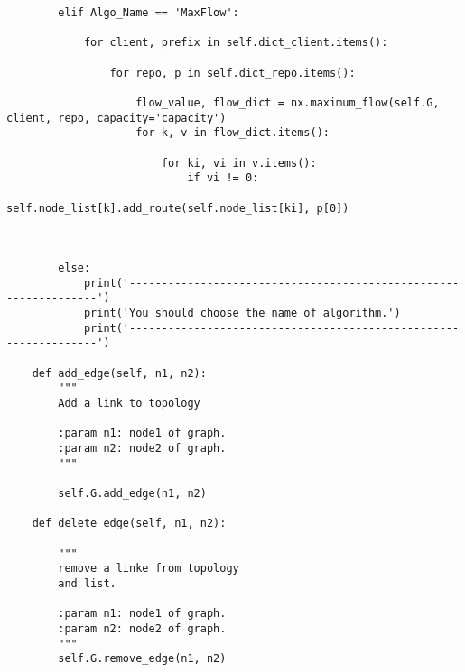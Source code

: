 \begin{lstlisting}
        elif Algo_Name == 'MaxFlow':

            for client, prefix in self.dict_client.items():

                for repo, p in self.dict_repo.items():

                    flow_value, flow_dict = nx.maximum_flow(self.G, client, repo, capacity='capacity')
                    for k, v in flow_dict.items():
                        
                        for ki, vi in v.items():
                            if vi != 0:
                                self.node_list[k].add_route(self.node_list[ki], p[0]) 



        else:
            print('-----------------------------------------------------------------')
            print('You should choose the name of algorithm.')
            print('-----------------------------------------------------------------')

    def add_edge(self, n1, n2):
        """
        Add a link to topology

        :param n1: node1 of graph.
        :param n2: node2 of graph.
        """

        self.G.add_edge(n1, n2)

    def delete_edge(self, n1, n2):

        """
        remove a linke from topology
        and list.

        :param n1: node1 of graph.
        :param n2: node2 of graph.
        """
        self.G.remove_edge(n1, n2)



\end{lstlisting}
